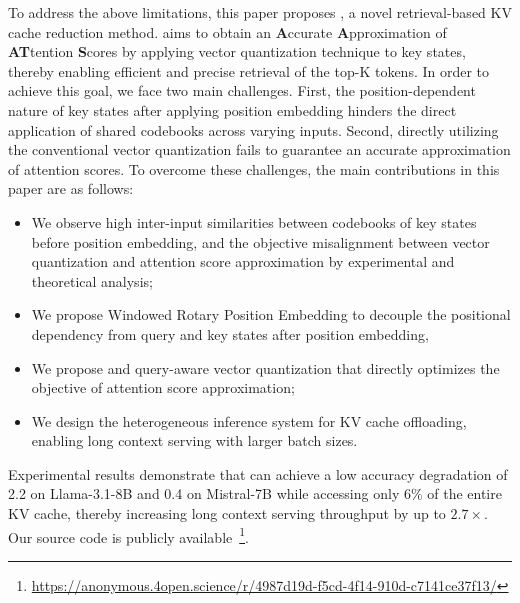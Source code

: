 To address the above limitations, this paper proposes {\name}, a novel retrieval-based KV cache reduction method.
{\name} aims to obtain an \textbf{A}ccurate \textbf{A}pproximation of \textbf{AT}tention \textbf{S}cores by applying vector quantization technique to key states, thereby enabling efficient and precise retrieval of the top-K tokens.
In order to achieve this goal, we face two main challenges.
First, the position-dependent nature of key states after applying position embedding hinders the direct application of shared codebooks across varying inputs.
Second, directly utilizing the conventional vector quantization fails to guarantee an accurate approximation of attention scores.
To overcome these challenges, the main contributions in this paper are as follows:
\begin{itemize}[nosep]
    \item We observe high inter-input similarities between
    codebooks 
    of key states before position embedding,
    and the objective misalignment between vector quantization and attention score approximation by experimental and theoretical analysis;
    \item We propose Windowed Rotary Position Embedding to decouple the positional dependency from query and key states after position embedding,
    \item 
    We propose 
    and query-aware vector quantization that directly optimizes the objective of attention score approximation;
    \item We design the heterogeneous inference system for KV cache offloading, enabling long context serving with larger batch sizes.
\end{itemize}
Experimental results demonstrate that {\name} can achieve a low accuracy degradation of 2.2 on Llama-3.1-8B and 0.4 on Mistral-7B while accessing only 6\% of the entire KV cache, thereby increasing long context serving throughput by up to \(2.7 \times\).
Our source code is publicly available~\footnote{\url{https://anonymous.4open.science/r/4987d19d-f5cd-4f14-910d-c7141ce37f13/}}.

